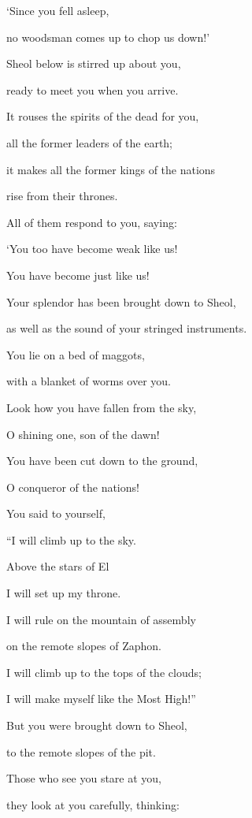 {\par }{\Q ‘Since
you fell asleep,
\par }{\Q no
woodsman
comes up
to chop us down!’
\par }{\Q {}Sheol
below
is stirred up
about you,
\par }{\Q ready to meet
you when you arrive.
\par }{\Q It rouses
the spirits of the dead
for you,
\par }{\Q all
the former leaders
of the earth;
\par }{\Q it makes all
the former kings
of the nations
\par }{\Q rise
from their thrones.
\par }{\Q {}All
of them respond
to you, saying:
\par }{\Q ‘You too
have
become weak
like
us!
\par }{\Q You
have become just like us!
\par }{\Q {}Your splendor
has been brought down
to Sheol,
\par }{\Q as well as the sound
of your stringed instruments.
\par }{\Q You lie on a bed
of maggots,
\par }{\Q with a blanket
of worms over you.
\par }{\Q {}Look how
you have fallen
from the sky,
\par }{\Q O shining
one, son
of the dawn!

\par }{\Q You have been cut down
to the ground,
\par }{\Q O conqueror
of the nations!
\par }{\Q {}You
said
to yourself,
\par }{\Q “I will climb up
to the sky.
\par }{\Q Above
the stars
of El
\par }{\Q I will set up
my throne.
\par }{\Q I will rule
on the mountain
of assembly
\par }{\Q on the remote slopes
of Zaphon.
\par }{\Q {}I will climb up
to the tops
of the clouds;
\par }{\Q I will make myself
like the Most High!”
\par }{\Q {}But
you were brought down
to
Sheol,
\par }{\Q to
the remote
slopes of the pit.
\par }{\Q {}Those who see
you stare
at you,
\par }{\Q they look at you carefully,
thinking:

}
